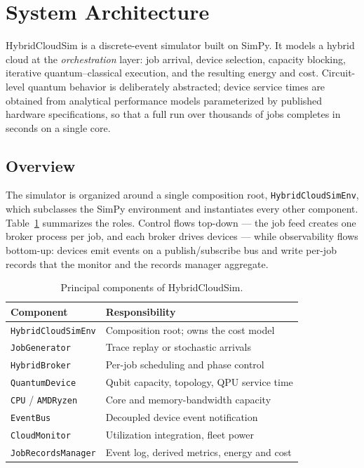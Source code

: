 \section{System Architecture}
\label{sec:architecture}

HybridCloudSim is a discrete-event simulator built on SimPy. It models a hybrid
cloud at the \emph{orchestration} layer: job arrival, device selection,
capacity blocking, iterative quantum--classical execution, and the resulting
energy and cost. Circuit-level quantum behavior is deliberately abstracted;
device service times are obtained from analytical performance models
parameterized by published hardware specifications, so that a full run over
thousands of jobs completes in seconds on a single core.

\subsection{Overview}
\label{sec:arch-overview}

The simulator is organized around a single composition root,
\texttt{HybridCloudSimEnv}, which subclasses the SimPy environment and
instantiates every other component. Table~\ref{tab:components} summarizes the
roles. Control flows top-down --- the job feed creates one broker process per
job, and each broker drives devices --- while observability flows bottom-up:
devices emit events on a publish/subscribe bus and write per-job records that
the monitor and the records manager aggregate.

\begin{table}[t]
\centering
\caption{Principal components of HybridCloudSim.}
\label{tab:components}
\small
\begin{tabular}{@{}ll@{}}
\toprule
\textbf{Component} & \textbf{Responsibility} \\
\midrule
\texttt{HybridCloudSimEnv} & Composition root; owns the cost model \\
\texttt{JobGenerator}      & Trace replay or stochastic arrivals \\
\texttt{HybridBroker}      & Per-job scheduling and phase control \\
\texttt{QuantumDevice}     & Qubit capacity, topology, QPU service time \\
\texttt{CPU} / \texttt{AMDRyzen} & Core and memory-bandwidth capacity \\
\texttt{EventBus}          & Decoupled device event notification \\
\texttt{CloudMonitor}      & Utilization integration, fleet power \\
\texttt{JobRecordsManager} & Event log, derived metrics, energy and cost \\
\bottomrule
\end{tabular}
\end{table}

